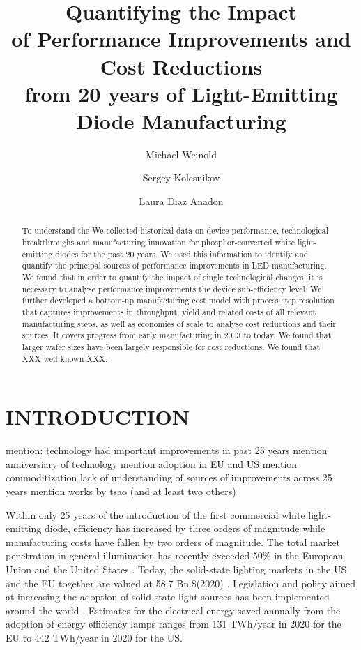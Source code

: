 \documentclass[a4paper,nocompress]{spie}  %
\title{Quantifying the Impact \\ of Performance Improvements and Cost Reductions \\ from 20 years of Light-Emitting Diode Manufacturing}
\author[a,b]{Michael Weinold}
\author[b]{Sergey Kolesnikov}
\author[c]{Laura Diaz Anadon}
\affil[a]{ETH Zurich, Chair of Entrepreneurial Risks, Scheuchzerstrasse 7, 8092 Zurich, Switzerland}
\affil[b]{University of Cambridge, Centre for Environment, Energy and Natural Resource Governance, The David Attenborough Building, CB2 3QZ Cambridge, UK}
\begin{document}
 
\maketitle

\begin{abstract}
    
    
    To understand the 
    We collected historical data on device performance, technological breakthroughs and manufacturing innovation for phosphor-converted white light-emitting diodes for the past 20 years. We used this information to identify and quantify the principal sources of performance improvements in LED manufacturing. We found that in order to quantify the impact of single technological changes, it is necessary to analyse performance improvements the device sub-efficiency level. We further developed a bottom-up manufacturing cost model with process step resolution that captures improvements in throughput, yield and related costs of all relevant manufacturing steps, as well as economies of scale to analyse cost reductions and their sources. It covers progress from early manufacturing in 2003 to today. We found that larger wafer sizes have been largely responsible for cost reductions. We found that XXX well known XXX.

\end{abstract}


\section{INTRODUCTION}
\label{sec:intro}

mention: technology had important improvements in past 25 years
mention anniversiary of technology
mention adoption in EU and US
mention commoditization
lack of understanding of sources of improvements across 25 years
mention works by tsao (and at least two others)

    Within only 25 years of the introduction of the first commercial white light-emitting diode, efficiency has increased by three orders of magnitude while manufacturing costs have fallen by two orders of magnitude. The total market penetration in general illumination has recently exceeded 50\% in the European Union and the United States \cite{eu2019impactass}\cite{stratunl2018}. Today, the solid-state lighting markets in the US and the EU together are valued at 58.7 Bn.\$(2020) \cite{gvr2020market_us}\cite{gvr2020market_eu}. Legislation and policy aimed at increasing the adoption of solid-state light sources has been implemented around the world \cite{2009-125-EC_regulation-2012_impact}. Estimates for the electrical energy saved annually from the adoption of energy efficiency lamps ranges from 131 TWh/year in 2020 for the EU to 442 TWh/year in 2020 for the US.
\end{document}
